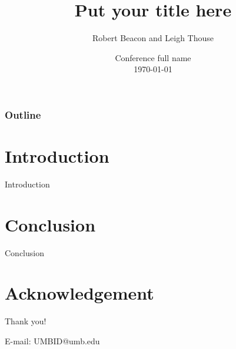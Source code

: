 \documentclass[10pt]{beamer}
\title[Shorter Title on Each Slide]{Put your title here}%
\author[Robert Beacon]{Robert Beacon\inst{1} and Leigh Thouse\inst{1}}%
\institute[UMB]{University of Massachusetts, Boston\inst{1}}
\date[\textcolor{white}{Conference Name, \today}]
{Conference full name\\
\today}
\begin{document}
\frame{\titlepage}
\begin{frame}
\frametitle{Outline}
\tableofcontents
\end{frame}



\section{Introduction}
\begin{frame}{Introduction}

\end{frame}


\section{Conclusion}
\begin{frame}{Conclusion}
\end{frame}

\section*{Acknowledgement}  
\begin{frame}

\textcolor{textcolor}{\huge{\centerline{Thank you!}}}
\vspace*{0.5cm}

\textcolor{textcolor}{\Large{\centerline{E-mail: UMBID@umb.edu}}}

\end{frame}
\end{document}
